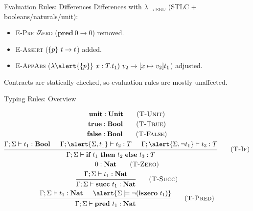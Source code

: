 \documentclass[handout]{beamer}
\begin{document}
\begin{frame}{Evaluation Rules: Differences}
    Differences with $\lambda_{\to \mathbb{B} \mathbb{N} \mathbb{U}}$ (STLC + booleans/naturals/unit):

    \begin{itemize}
        \item \textsc{E-PredZero} (\alert{$\textbf{pred} \ 0 \to 0$}) removed.
        \item \textsc{E-Assert} (\alert{$\qty{p} \ t \to t$}) added.
        \item \textsc{E-AppAbs} ($\lambda \alert{\qty{p}} \ x : T . t_1) \ v_2 \to [x \mapsto v_2] t_1$) adjusted.
    \end{itemize}

    Contracts are statically checked, so evaluation rules are mostly unaffected.
\end{frame}

\begin{frame}{Typing Rules: Overview}

\begin{gather*}
    \textbf{unit} : \textbf{Unit} \tag{\textsc{T-Unit}} \\
    \textbf{true} : \textbf{Bool} \tag{\textsc{T-True}} \\
    \textbf{false} : \textbf{Bool} \tag{\textsc{T-False}} \\
    {\begin{prooftree}
        \hypo{ \Gamma;\Sigma \vdash t_1 : \textbf{Bool} }
        \hypo{ \Gamma;\alert{\Sigma,t_1} \vdash t_2 : T }
        \hypo{ \Gamma;\alert{\Sigma,\neg t_1} \vdash t_3 : T }
        \infer3{ \Gamma;\Sigma \vdash \textbf{if} \ t_1 \ \textbf{then} \ t_2 \ \textbf{else} \ t_3 : T }
    \end{prooftree}} \tag{\textsc{T-If}} \\
    0 : \textbf{Nat} \tag{\textsc{T-Zero}} \\
    {\begin{prooftree}
        \hypo{ \Gamma;\Sigma \vdash t_1 : \textbf{Nat} }
        \infer1{ \Gamma;\Sigma \vdash \textbf{succ} \ t_1 : \textbf{Nat} }
    \end{prooftree}} \tag{\textsc{T-Succ}} \\
    {\begin{prooftree}
        \hypo{ \Gamma;\Sigma \vdash t_1 : \textbf{Nat} }
        \hypo{ \alert{\Sigma \models \neg(\textbf{iszero} \ t_1)} }
        \infer2{ \Gamma;\Sigma \vdash \textbf{pred} \ t_1 : \textbf{Nat} }
    \end{prooftree}} \tag{\textsc{T-Pred}}
\end{gather*}

\end{frame}
\end{document}
